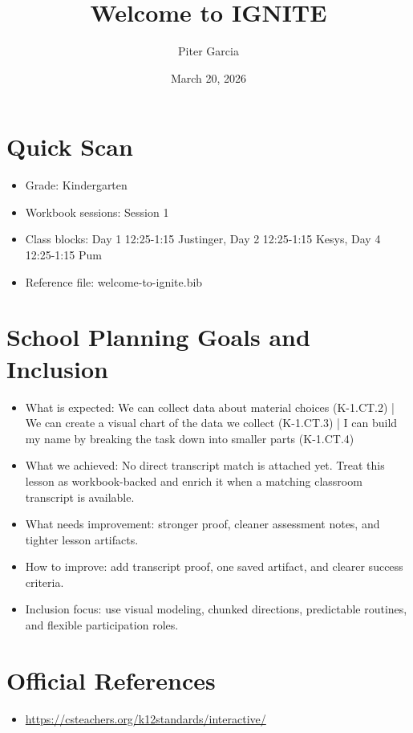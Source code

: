 \documentclass[11pt]{article}
\title{Welcome to IGNITE}
\author{Piter Garcia}
\date{March 20, 2026}
\begin{document}
\maketitle
\section*{Quick Scan}
\begin{itemize}[leftmargin=*]
\item Grade: Kindergarten
\item Workbook sessions: Session 1
\item Class blocks: Day 1 12:25-1:15 Justinger, Day 2 12:25-1:15 Kesys, Day 4 12:25-1:15 Pum
\item Reference file: welcome-to-ignite.bib
\end{itemize}
\section*{School Planning Goals and Inclusion}
\begin{itemize}[leftmargin=*]
\item What is expected: We can collect data about material choices (K-1.CT.2) | We can create a visual chart of the data we collect (K-1.CT.3) | I can build my name by breaking the task down into smaller parts (K-1.CT.4)
\item What we achieved: No direct transcript match is attached yet. Treat this lesson as workbook-backed and enrich it when a matching classroom transcript is available.
\item What needs improvement: stronger proof, cleaner assessment notes, and tighter lesson artifacts.
\item How to improve: add transcript proof, one saved artifact, and clearer success criteria.
\item Inclusion focus: use visual modeling, chunked directions, predictable routines, and flexible participation roles.
\end{itemize}
\section*{Official References}
\begin{itemize}[leftmargin=*]
\item \url{https://csteachers.org/k12standards/interactive/}

\end{itemize}
\end{document}
